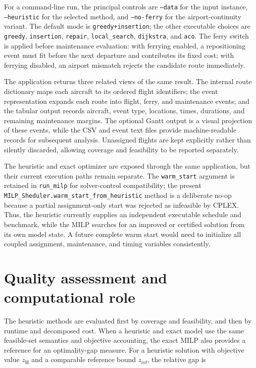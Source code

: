 For a command-line run, the principal controls are \texttt{--data} for the
input instance, \texttt{--heuristic} for the selected method, and
\texttt{--no-ferry} for the airport-continuity variant. The default mode is
\texttt{greedy+insertion}; the other executable choices are \texttt{greedy},
\texttt{insertion}, \texttt{repair}, \texttt{local\_search},
\texttt{dijkstra}, and \texttt{aco}. The ferry switch is applied before
maintenance evaluation: with ferrying enabled, a repositioning event must fit
before the next departure and contributes its fixed cost; with ferrying
disabled, an airport mismatch rejects the candidate route immediately.

The application returns three related views of the same result. The internal
route dictionary maps each aircraft to its ordered flight identifiers; the
event representation expands each route into flight, ferry, and maintenance
events; and the tabular output records aircraft, event type, locations, times,
durations, and remaining maintenance margins. The optional Gantt output is a
visual projection of these events, while the CSV and event text files provide
machine-readable records for subsequent analysis. Unassigned flights are kept
explicitly rather than silently discarded, allowing coverage and feasibility to
be reported separately.

The heuristic and exact optimizer are exposed through the same application, but
their current execution paths remain separate. The \texttt{warm\_start}
argument is retained in \texttt{run\_milp} for solver-control compatibility;
the present \texttt{MILP\_Sheduler.warm\_start\_from\_heuristic} method is a
deliberate no-op because a partial assignment-only start was rejected as
infeasible by CPLEX. Thus, the heuristic currently supplies an independent
executable schedule and benchmark, while the MILP searches for an improved or
certified solution from its own model state. A future complete warm start would
need to initialize all coupled assignment, maintenance, and timing variables
consistently.

\section{Quality assessment and computational role}
\label{sec:heuristic_quality}

The heuristic methods are evaluated first by coverage and feasibility, and then
by runtime and decomposed cost. When a heuristic and exact model use the same
feasible-set semantics and objective accounting, the exact MILP also provides a
reference for an optimality-gap measure. For a heuristic solution with objective
value $z_{\mathrm{H}}$ and a comparable reference bound $z_{\mathrm{ref}}$, the
relative gap is

